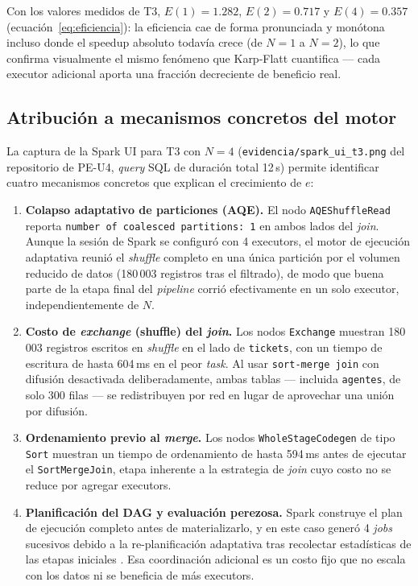 \documentclass[11pt]{article}
\begin{document}
Con los valores medidos de T3, $E(1)=1.282$, $E(2)=0.717$ y
$E(4)=0.357$ (ecuación~\eqref{eq:eficiencia}): la eficiencia cae de
forma pronunciada y monótona incluso donde el speedup absoluto todavía
crece (de $N=1$ a $N=2$), lo que confirma visualmente el mismo
fenómeno que Karp-Flatt cuantifica --- cada executor adicional aporta
una fracción decreciente de beneficio real.

\subsection{Atribución a mecanismos concretos del motor}

La captura de la Spark UI para T3 con $N=4$ (\texttt{evidencia/spark\_ui\_t3.png}
del repositorio de PE-U4, \emph{query} SQL de duración total 12\,s)
permite identificar cuatro mecanismos concretos que explican el
crecimiento de $e$:

\begin{enumerate}
  \item \textbf{Colapso adaptativo de particiones (AQE).} El nodo
  \texttt{AQEShuffleRead} reporta \texttt{number of coalesced
  partitions: 1} en ambos lados del \emph{join}. Aunque la sesión de
  Spark se configuró con 4 executors, el motor de ejecución adaptativa
  reunió el \emph{shuffle} completo en una única partición por el
  volumen reducido de datos (180\,003 registros tras el filtrado), de
  modo que buena parte de la etapa final del \emph{pipeline} corrió
  efectivamente en un solo executor, independientemente de $N$.

  \item \textbf{Costo de \emph{exchange} (shuffle) del \emph{join}.}
  Los nodos \texttt{Exchange} muestran 180\,003 registros escritos en
  \emph{shuffle} en el lado de \texttt{tickets}, con un tiempo de
  escritura de hasta 604\,ms en el peor \emph{task}. Al usar
  \texttt{sort-merge join} con difusión desactivada deliberadamente,
  ambas tablas --- incluida \texttt{agentes}, de solo 300 filas --- se
  redistribuyen por red en lugar de aprovechar una unión por difusión.

  \item \textbf{Ordenamiento previo al \emph{merge}.} Los nodos
  \texttt{WholeStageCodegen} de tipo \texttt{Sort} muestran un tiempo de
  ordenamiento de hasta 594\,ms antes de ejecutar el
  \texttt{SortMergeJoin}, etapa inherente a la estrategia de \emph{join}
  cuyo costo no se reduce por agregar executors.

  \item \textbf{Planificación del DAG y evaluación perezosa.} Spark
  construye el plan de ejecución completo antes de materializarlo, y en
  este caso generó 4 \emph{jobs} sucesivos debido a la re-planificación
  adaptativa tras recolectar estadísticas de las etapas iniciales
  \cite{zaharia2016}. Esa coordinación adicional es un costo fijo que
  no escala con los datos ni se beneficia de más executors.
\end{enumerate}
\end{document}
